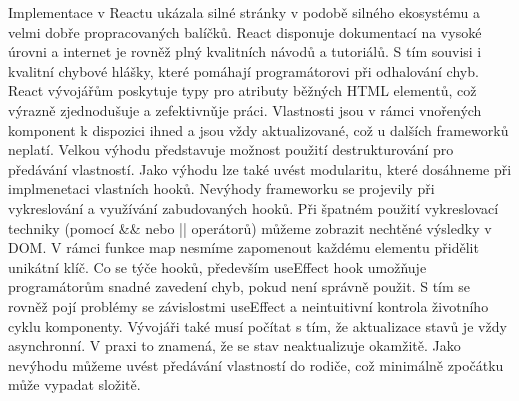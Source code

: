 Implementace v Reactu ukázala silné stránky v podobě silného ekosystému a velmi dobře propracovaných balíčků. 
React disponuje dokumentací na vysoké úrovni a internet je rovněž plný kvalitních návodů a tutoriálů. 
S tím souvisi i kvalitní chybové hlášky, které pomáhají programátorovi při odhalování chyb. 
React vývojářům poskytuje typy pro atributy běžných HTML elementů, což výrazně zjednodušuje a zefektivnǔje práci. 
Vlastnosti jsou v rámci vnořených komponent k dispozici ihned a jsou vždy aktualizované, což u dalších frameworků neplatí. 
Velkou výhodu představuje možnost použití destrukturování pro předávání vlastností. 
Jako výhodu lze také uvést modularitu, které dosáhneme při implmenetaci vlastních hooků. 
Nevýhody frameworku se projevily při vykreslování a využívání zabudovaných hooků. 
Při špatném použití vykreslovací techniky (pomocí \&\& nebo || operátorů) můžeme zobrazit nechtěné výsledky v DOM. 
V rámci funkce map nesmíme zapomenout každému elementu přidělit unikátní klíč. 
Co se týče hooků, především useEffect hook umožňuje programátorům snadné zavedení chyb, pokud není správně použit. 
S tím se rovněž pojí problémy se závislostmi useEffect a neintuitivní kontrola životního cyklu komponenty. 
Vývojáři také musí počítat s tím, že aktualizace stavů je vždy asynchronní. V praxi to znamená, že se stav neaktualizuje okamžitě. 
Jako nevýhodu můžeme uvést předávání vlastností do rodiče, což minimálně zpočátku může vypadat složitě.


